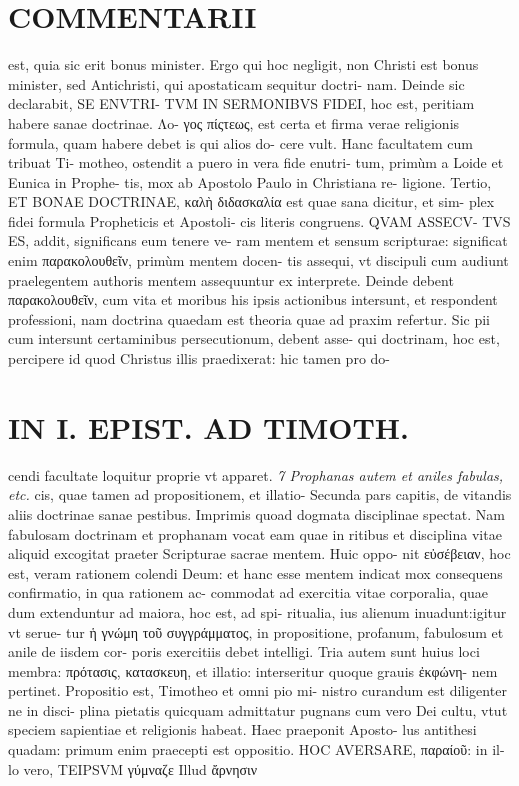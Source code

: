 \documentclass{article}
\begin{document}
\begin{pages}
\section*{COMMENTARII }
\marginpar{[ p.94 ]}\pstart est, quia sic erit bonus minister. Ergo qui hoc negligit, non Christi est bonus minister, sed Antichristi, qui apostaticam sequitur doctri- nam. Deinde sic declarabit, SE ENVTRI- TVM IN SERMONIBVS FIDEI, hoc est, peritiam habere sanae doctrinae. Λo- γος πίςτεως, est certa et firma verae religionis formula, quam habere debet is qui alios do- cere vult. Hanc facultatem cum tribuat Ti- motheo, ostendit a puero in vera fide enutri- tum, primùm a Loide et Eunica in Prophe- tis, mox ab Apostolo Paulo in Christiana re- ligione.  \pend\pstart Tertio, ET BONAE DOCTRINAE, καλὴ διδασκαλία est quae sana dicitur, et sim- plex fidei formula Propheticis et Apostoli- cis literis congruens. QVAM ASSECV- TVS ES, addit, significans eum tenere ve- ram mentem et sensum scripturae: significat enim παρακολουθεῖν, primùm mentem docen- tis assequi, vt discipuli cum audiunt praelegentem authoris mentem assequuntur ex interprete. Deinde debent παρακολουθεῖν, cum vita et moribus  his ipsis actionibus intersunt, et respondent professioni, nam doctrina quaedam est theoria quae ad praxim refertur. Sic pii cum intersunt certaminibus persecutionum, debent asse- qui doctrinam, hoc est, percipere id quod Christus illis praedixerat: hic tamen pro do-  \pend
\section*{IN I. EPIST. AD TIMOTH. }
\marginpar{[ p.95 ]}\pstart cendi facultate loquitur proprie vt apparet.  \pend
\textit{7 Prophanas autem et aniles fabulas, etc. }\pstart cis, quae tamen ad propositionem, et illatio- Secunda pars capitis, de vitandis aliis doctrinae sanae pestibus. Imprimis quoad dogmata disciplinae spectat. Nam fabulosam doctrinam et prophanam vocat eam quae in ritibus et disciplina vitae aliquid excogitat praeter Scripturae sacrae mentem. Huic oppo- nit εὐσέβειαν, hoc est, veram rationem colendi Deum: et hanc esse mentem indicat mox consequens confirmatio, in qua rationem ac- commodat ad exercitia vitae corporalia, quae dum extenduntur ad maiora, hoc est, ad spi- ritualia, ius alienum inuadunt:igitur vt serue- tur ἡ γνώμη τοῦ συγγράμματος, in propositione, profanum, fabulosum et anile de iisdem cor- poris exercitiis debet intelligi. Tria autem sunt huius loci membra: πρότασις, κατασκευη, et illatio: interseritur quoque grauis ἐκφώνη- nem pertinet.  \pend\pstart Propositio est, Timotheo et omni pio mi- nistro curandum est diligenter ne in disci- plina pietatis quicquam admittatur pugnans cum vero Dei cultu, vtut speciem sapientiae et religionis habeat. Haec praeponit Aposto- lus antithesi quadam: primum enim praecepti est oppositio. HOC AVERSARE, παραίοῦ: in il- lo vero, TEIPSVM γύμναζε Illud ἄρνησιν  \pend

\end{pages}
\end{document}
